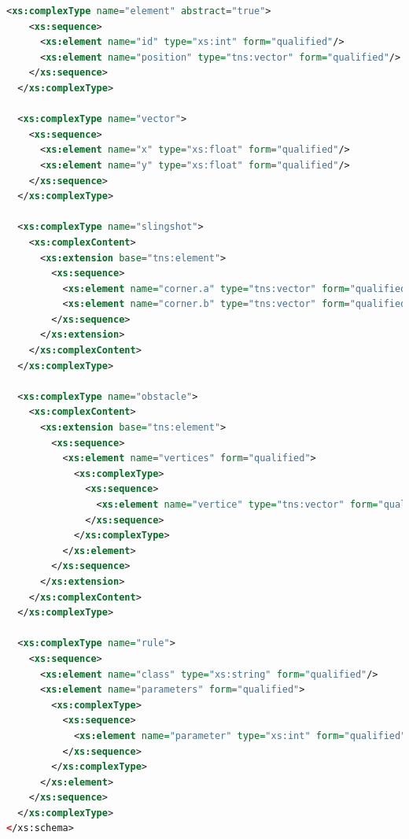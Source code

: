 \documentclass[fontsize=12pt,
               paper=a4,
               twoside=false,
               parskip=half,
               ]{scrartcl}
\begin{document}
\begin{lstlisting}[language=xml,label=lst:default_playfield,caption={schema for playfields.xml}]
  <xs:complexType name="element" abstract="true">
    <xs:sequence>
      <xs:element name="id" type="xs:int" form="qualified"/>
      <xs:element name="position" type="tns:vector" form="qualified"/>
    </xs:sequence>
  </xs:complexType>

  <xs:complexType name="vector">
    <xs:sequence>
      <xs:element name="x" type="xs:float" form="qualified"/>
      <xs:element name="y" type="xs:float" form="qualified"/>
    </xs:sequence>
  </xs:complexType>

  <xs:complexType name="slingshot">
    <xs:complexContent>
      <xs:extension base="tns:element">
        <xs:sequence>
          <xs:element name="corner.a" type="tns:vector" form="qualified"/>
          <xs:element name="corner.b" type="tns:vector" form="qualified"/>
        </xs:sequence>
      </xs:extension>
    </xs:complexContent>
  </xs:complexType>

  <xs:complexType name="obstacle">
    <xs:complexContent>
      <xs:extension base="tns:element">
        <xs:sequence>
          <xs:element name="vertices" form="qualified">
            <xs:complexType>
              <xs:sequence>
                <xs:element name="vertice" type="tns:vector" form="qualified" maxOccurs="unbounded"/>
              </xs:sequence>
            </xs:complexType>
          </xs:element>
        </xs:sequence>
      </xs:extension>
    </xs:complexContent>
  </xs:complexType>

  <xs:complexType name="rule">
    <xs:sequence>
      <xs:element name="class" type="xs:string" form="qualified"/>
      <xs:element name="parameters" form="qualified">
        <xs:complexType>
          <xs:sequence>
            <xs:element name="parameter" type="xs:int" form="qualified" maxOccurs="unbounded"/>
          </xs:sequence>
        </xs:complexType>
      </xs:element>
    </xs:sequence>
  </xs:complexType>
</xs:schema>
\end{lstlisting}
\end{document}
